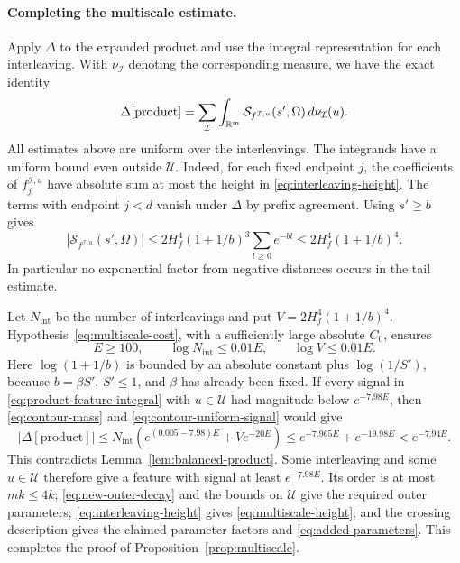 \paragraph{Completing the multiscale estimate.}
Apply $\Delta$ to the expanded product and use the integral
representation for each interleaving. With $\nu_{\mathcal I}$ denoting
the corresponding measure, we have the exact identity
\begin{equation}
 \Delta[\text{product}]
 =\sum_{\mathcal I}\int_{\mathbb R^m}
   \mathcal S_{f^{\mathcal I,u}}(s',\Omega)\,d\nu_{\mathcal I}(u).
 \label{eq:product-feature-integral}
\end{equation}
All estimates above are uniform over the interleavings. The integrands
have a uniform bound even outside $\mathcal U$. Indeed, for each fixed
endpoint $j$, the coefficients of $f_j^{\mathcal I,u}$ have absolute
sum at most the height in \eqref{eq:interleaving-height}. The terms with
endpoint $j<d$ vanish under $\Delta$ by prefix agreement.
Using $s'\ge b$ gives
\begin{equation}
 \left|\mathcal S_{f^{\mathcal I,u}}(s',\Omega)\right|
 \le 2H_f^4(1+1/b)^3\sum_{l\ge0}e^{-bl}
 \le 2H_f^4(1+1/b)^4.
 \label{eq:contour-uniform-signal}
\end{equation}
In particular no exponential factor from negative distances occurs
in the tail estimate.

Let $N_{\mathrm{int}}$ be the number of interleavings and put
$V=2H_f^4(1+1/b)^4$. Hypothesis~\eqref{eq:multiscale-cost}, with a
sufficiently large absolute $C_0$, ensures
\[
 E\ge100,\qquad \log N_{\mathrm{int}}\le0.01E,
 \qquad \log V\le0.01E.
\]
Here $\log(1+1/b)$ is bounded by an absolute constant plus
$\log(1/S')$, because $b=\beta S'$, $S'\le1$, and $\beta$ has already
been fixed. If every signal in \eqref{eq:product-feature-integral}
with $u\in\mathcal U$ had magnitude below $e^{-7.98E}$, then
\eqref{eq:contour-mass} and \eqref{eq:contour-uniform-signal} would give
\[
 |\Delta[\text{product}]|
 \le N_{\mathrm{int}}
       \left(e^{(0.005-7.98)E}+Ve^{-20E}\right)
 \le e^{-7.965E}+e^{-19.98E}
 <e^{-7.94E}.
\]
This contradicts Lemma~\ref{lem:balanced-product}. Some interleaving
and some $u\in\mathcal U$ therefore give a feature with signal at least
$e^{-7.98E}$. Its order is at most $mk\le4k$;
\eqref{eq:new-outer-decay} and the bounds on $\mathcal U$ give the
required outer parameters; \eqref{eq:interleaving-height} gives
\eqref{eq:multiscale-height}; and the crossing description gives the
claimed parameter factors and \eqref{eq:added-parameters}.
This completes the proof of Proposition~\ref{prop:multiscale}.
